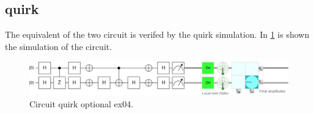 \subsection{quirk}
The equivalent of the two circuit is verifed by the quirk simulation.
In \cref{fig:quirk2} is shown the simulation of the circuit.
\begin{figure}[H]
\centering
\includegraphics[width=0.9\linewidth]{circuits/Quirk_2.png}
\caption{Circuit quirk optional ex04.}
\label{fig:quirk2}
\end{figure}
